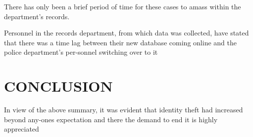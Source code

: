 \documentclass[10pt,letterpaper]{article}
\begin{document}
 There has only been a brief period of time for these cases to amass within the department’s records.

Personnel in the records department, from which data was collected, have stated that there was a time lag between their new database coming online and the police department’s per-sonnel switching over to it

\section{CONCLUSION }
In view of the above summary, it was evident that identity theft had increased beyond any-ones expectation and there the demand to end it is highly appreciated
\end{document}
